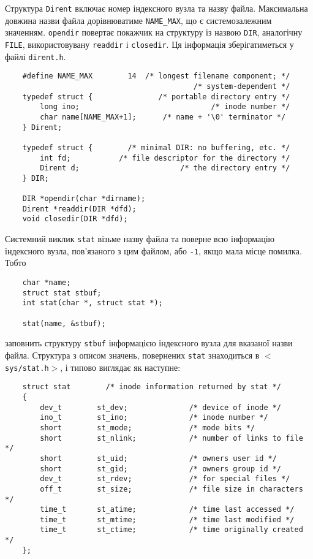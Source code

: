 \documentclass[a4paper,12pt]{book}
\begin{document}
  Структура \texttt{Dirent} включає номер індексного вузла та назву файла. Максимальна
  довжина назви файла дорівнюватиме \texttt{NAME\_MAX}, що є системозалежним
  значенням. \texttt{opendir} повертає покажчик на структуру із назвою \texttt{DIR},
  аналогічну \texttt{FILE}, використовувану \texttt{readdir} і \texttt{closedir}. Ця
  інформація зберігатиметься у файлі \texttt{dirent.h}.

  \begin{verbatim}
    #define NAME_MAX        14  /* longest filename component; */
                                           /* system-dependent */
    typedef struct {               /* portable directory entry */
        long ino;                              /* inode number */
        char name[NAME_MAX+1];      /* name + '\0' terminator */
    } Dirent;

    typedef struct {        /* minimal DIR: no buffering, etc. */
        int fd;           /* file descriptor for the directory */
        Dirent d;                       /* the directory entry */
    } DIR;

    DIR *opendir(char *dirname);
    Dirent *readdir(DIR *dfd);
    void closedir(DIR *dfd);
  \end{verbatim}

  Системний виклик \texttt{stat} візьме назву файла та поверне всю інформацію індексного
  вузла, пов'язаного з цим файлом, або \texttt{-1}, якщо мала місце помилка. Тобто
  \begin{verbatim}
    char *name;
    struct stat stbuf;
    int stat(char *, struct stat *);

    stat(name, &stbuf);
  \end{verbatim}
  заповнить структуру \texttt{stbuf} інформацією індексного вузла для вказаної назви
  файла. Структура з описом значень, повернених \texttt{stat} знаходиться в
  \texttt{\mbox{$<$}sys/stat.h\mbox{$>$}}, і типово виглядає як наступне:
  \begin{verbatim}
    struct stat        /* inode information returned by stat */
    {
        dev_t        st_dev;              /* device of inode */
        ino_t        st_ino;              /* inode number */
        short        st_mode;             /* mode bits */
        short        st_nlink;            /* number of links to file */
        short        st_uid;              /* owners user id */
        short        st_gid;              /* owners group id */
        dev_t        st_rdev;             /* for special files */
        off_t        st_size;             /* file size in characters */
        time_t       st_atime;            /* time last accessed */
        time_t       st_mtime;            /* time last modified */
        time_t       st_ctime;            /* time originally created */
    };
  \end{verbatim}
\end{document}
